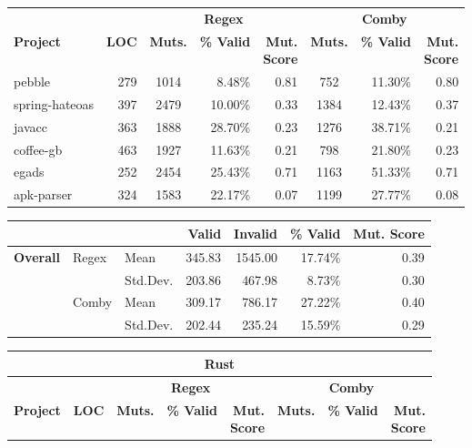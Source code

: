 \documentclass[acmsmall,screen,review,anonymous]{acmart}
\newcommand{\mr}[2]{\multirow{#1}{*}{#2}}
\newcommand{\mc}[3]{\multicolumn{#1}{#2}{#3}}
\begin{document}
{\begin{table}[hbtp]
\begin{varwidth}{.8\linewidth}
\begin{tabularx}{\linewidth}{X|r|crr|crr}
                 &              & \multicolumn{3}{c|}{\textbf{Regex}} &\multicolumn{3}{c}{\textbf{Comby}}  \\
\textbf{Project} & \textbf{LOC} & \textbf{Muts.} & \textbf{\% Valid} & \makecell{\textbf{Mut.} \\ \textbf{Score}} &  \textbf{Muts.} &  \textbf{\% Valid} & \makecell{\textbf{Mut.} \\ \textbf{Score}} \\\midrule
 pebble         & 279 & 1014 & 8.48\% & 0.81 & 752 & 11.30\%  & 0.80 \\
 spring-hateoas & 397 & 2479 & 10.00\% & 0.33 & 1384 & 12.43\% & 0.37 \\
 javacc         & 363 & 1888 & 28.70\% & 0.23 & 1276 & 38.71\% & 0.21 \\
 coffee-gb      & 463 & 1927 & 11.63\% & 0.21 & 798 & 21.80\% & 0.23\\
 egads          & 252 & 2454 & 25.43\% & 0.71 & 1163 & 51.33\% & 0.71\\
 apk-parser     & 324 & 1583 & 22.17\% & 0.07 & 1199 & 27.77\% & 0.08 \\\bottomrule
\end{tabularx}
\begin{tabularx}{\linewidth}{Xllrrrr}
              & & & \textbf{Valid}  & \textbf{Invalid}  & \textbf{\% Valid} & \textbf{Mut. Score} \\\midrule
\multirow{4}{*}{\textbf{Overall}} & \mr{2}{Regex} & Mean     &  345.83 & 1545.00  & 17.74\% & 0.39\\
              &   & Std.Dev. & 203.86 & 467.98 & 8.73\%  & 0.30\\\cline{2-7}
& \mr{2}{Comby} & Mean     & 309.17 & 786.17 & 27.22\% & 0.40\\
              &   & Std.Dev. & 202.44 & 235.24  & 15.59\% & 0.29 \\\bottomrule
\end{tabularx}
\begin{tabularx}{\linewidth}{X|r|crr|crr}
\toprule
\mc{8}{c}{\textbf{Rust}} \\ \midrule
                 &              & \multicolumn{3}{c|}{\textbf{Regex}} &\multicolumn{3}{c}{\textbf{Comby}}  \\
\textbf{Project} & \textbf{LOC} & \textbf{Muts.} & \textbf{\% Valid} & \makecell{\textbf{Mut.} \\ \textbf{Score}} & \textbf{Muts.} &  \textbf{\% Valid} & \makecell{\textbf{Mut.} \\ \textbf{Score}}\\\midrule

\end{tabularx}
\end{varwidth}
\end{table}}
\end{document}
